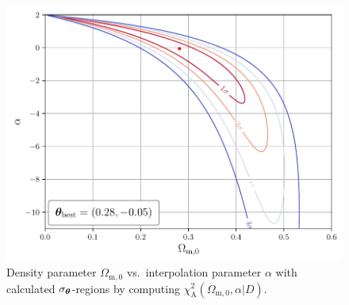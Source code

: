 \begin{figure}[]
    \centering
    \includegraphics[scale=1.0]{figures/plots/PDF/DGP-analytic-chi2_Omega-m0-vs-alpha-full.pdf}
    \caption{Density parameter $\Omega_{\text{m},0}$ vs.\ interpolation parameter $\alpha$ with calculated $\sigma_{\vb*{\theta}}$-regions by computing $\chi_{\text{A}}^2(\Omega_{\text{m},0}, \alpha \vert D)$.}
    \label{fig:DGP-analytic-chi2_Omega-m0-vs-alpha-full}
\end{figure}

